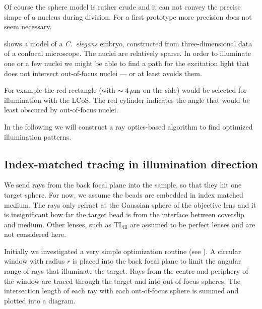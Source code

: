 Of course the sphere model is rather crude and it can not convey the
precise shape of a nucleus during division. For a first prototype more
precision does not seem necessary.

 shows a model of a \emph{C.~elegans} embryo,
constructed from three-dimensional data of a confocal microscope. The
nuclei are relatively sparse. In order to illuminate one or a few
nuclei we might be able to find a path for the excitation light that
does not intersect out-of-focus nuclei --- or at least avoids them. 

For example the red rectangle (with $\sim\unit[4]{\mu m}$ on the side)
would be selected for illumination with the LCoS. The red cylinder
indicates the angle that would be least obscured by out-of-focus
nuclei.

In the following we will construct a ray optics-based algorithm to
find optimized illumination patterns.


\subsection{Index-matched tracing in illumination direction}

We send rays from the back focal plane into the sample, so that they
hit one target sphere. For now, we assume the beads are embedded in
index matched medium. The rays only refract at the Gaussian sphere of
the objective lens and it is insignificant how far the target bead is
from the interface between coverslip and medium. Other lenses, such as
$\textrm{TL}_\textrm{ill}$ are assumed to be perfect lenses and are
not considered here.

Initially we investigated a very simple optimization routine (see
). A circular
window with radius $r$ is placed into the back focal plane to limit
the angular range of rays that illuminate the target. Rays from the
centre and periphery of the window are traced through the target and
into out-of-focus spheres. The intersection length of each ray with
each out-of-focus sphere is summed and plotted into a diagram.

